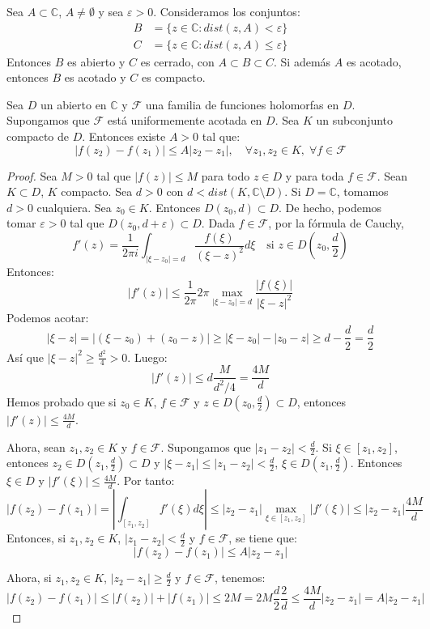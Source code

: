 \begin{lemma}
    Sea $A \subset \mathbb{C}$, $A \neq \emptyset$ y sea $\varepsilon > 0$.
    Consideramos los conjuntos:
    \begin{align*}
        B & = \{z \in \mathbb{C} : dist(z, A) < \varepsilon\}    \\
        C & = \{z \in \mathbb{C} : dist(z, A) \leq \varepsilon\}
    \end{align*}
    Entonces $B$ es abierto y $C$ es cerrado, con $A \subset B \subset C$.
    Si además $A$ es acotado, entonces $B$ es acotado y $C$ es compacto.
\end{lemma}

\begin{proposition}
    Sea $D$ un abierto en $\mathbb{C}$ y $\mathcal{F}$ una familia de funciones holomorfas en $D$.
    Supongamos que $\mathcal{F}$ está uniformemente acotada en $D$.
    Sea $K$ un subconjunto compacto de $D$.
    Entonces existe $A > 0$ tal que:
    $$|f(z_2)-f(z_1)| \leq A|z_2-z_1|, \quad \forall z_1, z_2 \in K, \; \forall f \in \mathcal{F}$$
\end{proposition}

\begin{proof}
    Sea $M > 0$ tal que $|f(z)| \leq M$ para todo $z \in D$ y para toda $f \in \mathcal{F}$.
    Sean $K \subset D$, $K$ compacto.
    Sea $d > 0$ con $d < dist(K, \mathbb{C} \setminus D)$.
    Si $D = \mathbb{C}$, tomamos $d > 0$ cualquiera.
    Sea $z_0 \in K$.
    Entonces $D(z_0, d) \subset D$.
    De hecho, podemos tomar $\varepsilon > 0$ tal que $D(z_0, d+\varepsilon) \subset D$.
    Dada $f \in \mathcal{F}$, por la fórmula de Cauchy,
    $$f'(z) = \frac{1}{2\pi i} \int_{|\xi-z_0|=d} \frac{f(\xi)}{(\xi-z)^2}d\xi \quad \text{si } z \in D\left(z_0, \frac{d}{2}\right)$$
    Entonces:
    $$|f'(z)| \leq \frac{1}{2\pi}2\pi \max_{|\xi-z_0|=d} \frac{|f(\xi)|}{|\xi-z|^2}$$
    Podemos acotar:
    $$|\xi-z| = |(\xi-z_0) + (z_0-z)| \geq |\xi-z_0| - |z_0-z| \geq d - \frac{d}{2} = \frac{d}{2}$$
    Así que $|\xi-z|^2 \geq \frac{d^2}{4} > 0$.
    Luego:
    $$|f'(z)| \leq d\frac{M}{d^2/4} = \frac{4M}{d}$$
    Hemos probado que si $z_0 \in K$, $f \in \mathcal{F}$ y $z \in D\left(z_0, \frac{d}{2}\right) \subset D$, entonces $|f'(z)| \leq \frac{4M}{d}$.

    Ahora, sean $z_1, z_2 \in K$ y $f \in \mathcal{F}$.
    Supongamos que $|z_1-z_2| < \frac{d}{2}$.
    Si $\xi \in [z_1, z_2]$, entonces $z_2 \in D\left(z_1, \frac{d}{2}\right) \subset D$ y $|\xi-z_1| \leq |z_1-z_2| < \frac{d}{2}$, $\xi \in D\left(z_1, \frac{d}{2}\right)$.
    Entonces $\xi \in D$ y $|f'(\xi)| \leq \frac{4M}{d}$.
    Por tanto:
    $$|f(z_2)-f(z_1)| = \left|\int_{[z_1, z_2]} f'(\xi)d\xi\right| \leq |z_2-z_1| \max_{\xi \in [z_1, z_2]} |f'(\xi)| \leq |z_2-z_1| \frac{4M}{d}$$
    Entonces, si $z_1, z_2 \in K$, $|z_1-z_2| < \frac{d}{2}$ y $f \in \mathcal{F}$, se tiene que:
    $$|f(z_2)-f(z_1)| \leq A|z_2-z_1|$$

    Ahora, si $z_1, z_2 \in K$, $|z_2-z_1| \geq \frac{d}{2}$ y $f \in \mathcal{F}$, tenemos:
    $$|f(z_2)-f(z_1)| \leq |f(z_2)| + |f(z_1)| \leq 2M = 2M \frac{d}{2}\frac{2}{d} \leq \frac{4M}{d}|z_2-z_1| = A|z_2-z_1|$$
\end{proof}

